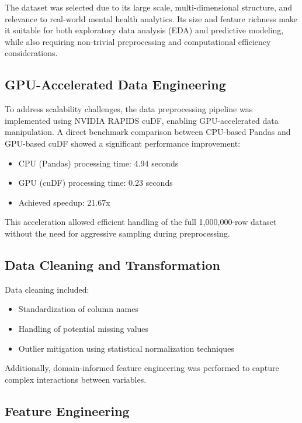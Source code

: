 \documentclass[conference]{IEEEtran}
\begin{document}
The dataset was selected due to its large scale, multi-dimensional structure, and relevance to real-world mental health analytics. Its size and feature richness make it suitable for both exploratory data analysis (EDA) and predictive modeling, while also requiring non-trivial preprocessing and computational efficiency considerations.

\subsection{GPU-Accelerated Data Engineering}

To address scalability challenges, the data preprocessing pipeline was implemented using NVIDIA RAPIDS cuDF, enabling GPU-accelerated data manipulation. A direct benchmark comparison between CPU-based Pandas and GPU-based cuDF showed a significant performance improvement:

\begin{itemize}
    \item CPU (Pandas) processing time: 4.94 seconds
    \item GPU (cuDF) processing time: 0.23 seconds
    \item Achieved speedup: 21.67x
\end{itemize}

This acceleration allowed efficient handling of the full 1,000,000-row dataset without the need for aggressive sampling during preprocessing.

\subsection{Data Cleaning and Transformation}

Data cleaning included:
\begin{itemize}
    \item Standardization of column names
    \item Handling of potential missing values
    \item Outlier mitigation using statistical normalization techniques
\end{itemize}

Additionally, domain-informed feature engineering was performed to capture complex interactions between variables.

\subsection{Feature Engineering}
\end{document}
